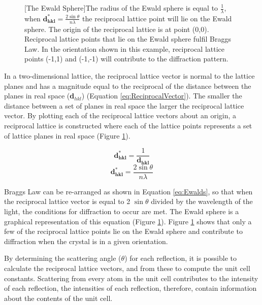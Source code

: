 \begin{figure}[!htbp]
  \begin{minipage}{\linewidth}
	[The Ewald Sphere]{The radius of the Ewald sphere is equal to $\frac{1}{\lambda}$, when $\mathbf{d^{*}_{hkl}} = \frac{2 \sin \theta}{n \lambda}$ the reciprocal lattice point will lie on the Ewald sphere. The origin of the reciprocal lattice is at point (0,0). Reciprocal lattice points that lie on the Ewald sphere fulfil Braggs Law. In the orientation shown in this example, reciprocal lattice points (-1,1) and (-1,-1) will contribute to the diffraction pattern.
	   \label{fig:Ewald}}	
\end{minipage} 
\end{figure}   

In a two-dimensional lattice, the reciprocal lattice vector is normal to the lattice planes and has a magnitude equal to the reciprocal of the distance between the planes in real space (\textbf{d$_{hkl}$}) (Equation \ref{eq:ReciprocalVector}). The smaller the distance between a set of planes in real space the larger the reciprocal lattice vector. By plotting each of the reciprocal lattice vectors about an origin, a reciprocal lattice is constructed where each of the lattice points represents a set of lattice planes in real space (Figure \ref{fig:Ewald}). 

\begin{equation}\label{eq:ReciprocalVector}
 \mathbf{d^{*}_{hkl}} = \frac{1}{\mathbf{d_{hkl}}} 
\end{equation}
\begin{equation}\label{eq:Ewalds}
 \mathbf{d^{*}_{hkl}} = \frac{2 \sin \theta}{n \lambda} 
\end{equation} 

Braggs Law can be re-arranged as shown in Equation \ref{eq:Ewalds}, so that when the reciprocal lattice vector is equal to 2 $\sin \theta$ divided by the wavelength of the light, the conditions for diffraction to occur are met. The Ewald sphere is a graphical representation of this equation (Figure \ref{fig:Ewald}). Figure \ref{fig:Ewald} shows that only a few of the reciprocal lattice points lie on the Ewald sphere and contribute to diffraction when the crystal is in a given orientation. 

By determining the scattering angle ($\theta$) for each reflection, it is possible to calculate the reciprocal lattice vectors, and from these to compute the unit cell constants. Scattering from every atom in the unit cell contributes to the intensity of each reflection, the intensities of each reflection, therefore, contain information about the contents of the unit cell. 

